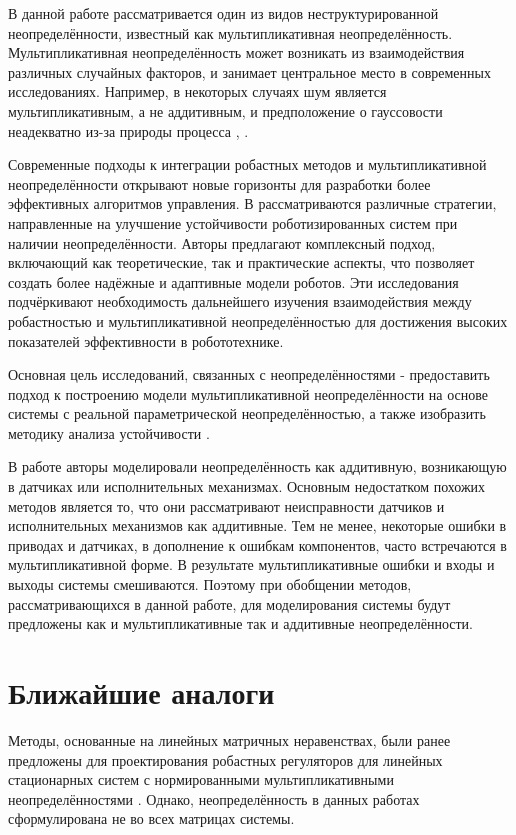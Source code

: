 В данной работе рассматривается один из видов неструктурированной неопределённости, известный как мультипликативная неопределённость. Мультипликативная неопределённость может возникать из взаимодействия различных случайных факторов, и занимает центральное место в современных исследованиях. Например, в некоторых случаях шум является мультипликативным, а не аддитивным, и предположение о гауссовости неадекватно из-за природы процесса \cite{Bosse2016}, \cite{Panza2015}.

Современные подходы к интеграции робастных методов и мультипликативной неопределённости открывают новые горизонты для разработки более эффективных алгоритмов управления. В \cite{Radek2017} рассматриваются различные стратегии, направленные на улучшение устойчивости роботизированных систем при наличии неопределённости. Авторы предлагают комплексный подход, включающий как теоретические, так и практические аспекты, что позволяет создать более надёжные и адаптивные модели роботов. Эти исследования подчёркивают необходимость дальнейшего изучения взаимодействия между робастностью и мультипликативной неопределённостью для достижения высоких показателей эффективности в робототехнике.

Основная цель исследований, связанных с неопределённостями - предоставить подход к построению модели мультипликативной неопределённости на основе системы с реальной параметрической неопределённостью, а также изобразить методику анализа устойчивости \cite{Skogestad2005}.

В работе \cite{Mabrouk2023} авторы моделировали неопределённость как аддитивную, возникающую в датчиках или исполнительных механизмах. Основным недостатком похожих методов является то, что они рассматривают неисправности датчиков и исполнительных механизмов как аддитивные. Тем не менее, некоторые ошибки в приводах и датчиках, в дополнение к ошибкам компонентов, часто встречаются в мультипликативной форме. В результате мультипликативные ошибки и входы и выходы системы смешиваются. Поэтому при обобщении методов, рассматривающихся в данной работе, для моделирования системы будут предложены как и мультипликативные так и аддитивные неопределённости.
 
\section{Ближайшие аналоги}\label{sec:ch1/sec6}

Методы, основанные на линейных матричных неравенствах, были ранее предложены для проектирования робастных регуляторов для линейных стационарных систем с нормированными мультипликативными неопределённостями \cite{POLYAK2021,ROTONDO2014}. Однако, неопределённость в данных работах сформулирована не во всех матрицах системы.

